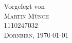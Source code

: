 \begin{titlepage}
\begin{center}
\begin{minipage}{0.48\textwidth}
\begin{center}
\end{center}
\end{minipage}
\hfill

\vspace*{\fill}

Vorgelegt von\\ [0.4cm]
\textsc{\Large Martin Münch}\\
1110247032 \\[2cm]

\textsc{ \large Dornbirn, \today}
\vfill %

\end{center}

\end{titlepage}

